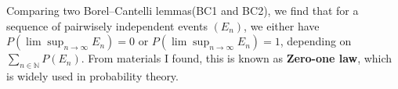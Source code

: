 \documentclass{article}
\newcommand{\mbn}{\mathbb{N}}
\begin{document}
Comparing two Borel–Cantelli lemmas(BC1 and BC2), we find that for a sequence of pairwisely independent events $(E_n)$, we either have $P(\lim \sup _{n \to \infty} E_n) = 0$ or $P(\lim \sup _{n \to \infty} E_n) = 1$, depending on $\sum_{n\in\mbn} P(E_n)$. From materials I found, this is known as \textbf{Zero-one law}, which is widely used in probability theory.
\end{document}
